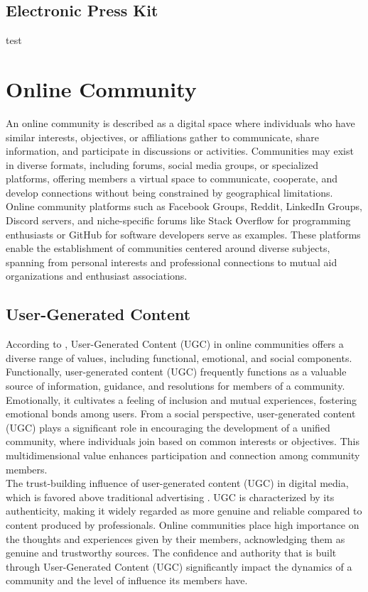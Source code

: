 \subsection{Electronic Press Kit}
test

\section{Online Community}
An online community is described as a digital space where individuals who have similar interests, objectives, or affiliations gather to communicate, share information, and participate in discussions or activities. Communities may exist in diverse formats, including forums, social media groups, or specialized platforms, offering members a virtual space to communicate, cooperate, and develop connections without being constrained by geographical limitations. Online community platforms such as Facebook Groups, Reddit, LinkedIn Groups, Discord servers, and niche-specific forums like Stack Overflow for programming enthusiasts or GitHub for software developers serve as examples. These platforms enable the establishment of communities centered around diverse subjects, spanning from personal interests and professional connections to mutual aid organizations and enthusiast associations.

\subsection{User-Generated Content}
According to \textcite{v22}, User-Generated Content (UGC) in online communities offers a diverse range of values, including functional, emotional, and social components. Functionally, user-generated content (UGC) frequently functions as a valuable source of information, guidance, and resolutions for members of a community. Emotionally, it cultivates a feeling of inclusion and mutual experiences, fostering emotional bonds among users. From a social perspective, user-generated content (UGC) plays a significant role in encouraging the development of a unified community, where individuals join based on common interests or objectives. This multidimensional value enhances participation and connection among community members. \\

The trust-building influence of user-generated content (UGC) in digital media, which is favored above traditional advertising \parencite{v22}. UGC is characterized by its authenticity, making it widely regarded as more genuine and reliable compared to content produced by professionals. Online communities place high importance on the thoughts and experiences given by their members, acknowledging them as genuine and trustworthy sources. The confidence and authority that is built through User-Generated Content (UGC) significantly impact the dynamics of a community and the level of influence its members have. \\

